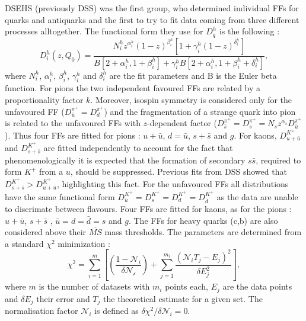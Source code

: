 DSEHS (previously DSS) was the first group, who determined individual FFs for quarks and antiquarks and the first to try to fit data coming from three different processes alltogether.
The functional form they use for $D^h_q$ is the following :
%
\begin{equation}
  D^h_i (z,Q_0) = \frac{N^h_i z^{\alpha^h_i}(1-z)^{\beta^h_i}\left[ 1+\gamma^h_i(1-z)^{\delta^h_i}\right]}{B\left[2+\alpha^h_i,1+\beta^h_i\right]+\gamma^h_i B\left[2+\alpha^h_i,1+\beta^h_i+\delta^h_i\right]},
  \label{eq:DSEHSparam}
\end{equation}
%
where $N^h_i$, $\alpha^h_i$, $\beta^h_i$, $\gamma^h_i$ and $\delta^h_i$  are the fit parameters and B is the Euler beta function. For pions the two independent favoured FFs are related by a proportionality factor $k$. Moreover, isospin symmetry is considered only for the unfavoured FF ($D^{\pi^{+}}_{\bar{u}} = D^{\pi^{+}}_{d}$) and the fragmentation of a strange quark into pion is related to the unfavoured FFs with $z$-dependent factor ($D^{\pi^{+}}_{\bar{s}} = D^{\pi^{+}}_{s}=N_s z^{\alpha_s} D^{\pi^{+}}_{\bar{u}}$). Thus four FFs are fitted for pions : $u+\bar{u}$, $d=\bar{u}$, $s+\bar{s}$ and $g$. For kaons, $D^{K^+}_{u+\bar{u}}$ and $D^{K^+}_{s+\bar{s}}$ are fitted independently to account for the fact that phenomenologically it is expected that the formation of secondary $s\bar{s}$, required to form $K^+$ from a $u$, should be suppressed. Previous fits from DSS showed that $D^{K^+}_{s+\bar{s}} > D^{K^+}_{u+\bar{u}}$, highlighting this fact. For the unfavoured FFs all distributions have the same functional form  $D^{K^+}_{\bar{u}} = D^{K^+}_{s} = D^{K^+}_{d} = D^{K^+}_{\bar{d}}$ as the data are unable to discrimate between flavours. Four FFs are fitted for kaons, as for the pions :  $u+\bar{u}$, $s+\bar{s}$ , $\bar{u}=d=\bar{d}=s$ and $g$.
The FFs for heavy quarks (c,b) are also considered above their $\overline{MS}$ mass thresholds.
The parameters are determined from a standard $\chi^2$ minimization :
%
\begin{equation}
  \chi^2 =  \sum_{i=1}^{m} \left[ \left( \frac{1-\mathscr{N}_i}{\delta\mathscr{N_i}} \right) + \sum_{j=1}^{m_i} \frac{(\mathscr{N}_i T_j - E_j)^2}{\delta E^2_j} \right],
  \label{eq:DSEHSmin}
\end{equation}
%
where $m$ is the number of datasets with $m_i$ points each, $E_j$ are the data points and $\delta E_j$ their error and $T_j$ the theoretical estimate for a given set. The normalisation factor $\mathscr{N}_i$ is defined as $\delta \chi^2 / \delta\mathscr{N}_i = 0$.

